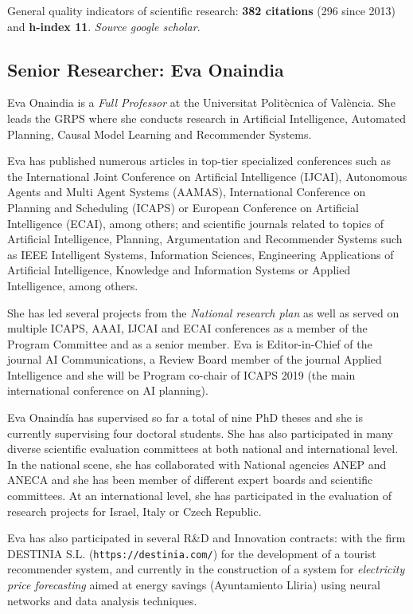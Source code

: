 \documentclass[10pt,a4paper]{paper}
\begin{document}
General quality indicators of scientific research: {\bf 382 citations} (296 since 2013) and {\bf h-index 11}. {\scriptsize\em Source google scholar}.


\subsection{Senior Researcher: Eva Onaindia}
Eva Onaindia is a {\em Full Professor} at the Universitat Politècnica of València. She leads the GRPS where she conducts research in Artificial Intelligence, Automated Planning, Causal Model Learning and Recommender Systems.

Eva has published numerous articles in top-tier specialized conferences such as the International Joint Conference on Artificial Intelligence (IJCAI), Autonomous Agents and Multi Agent Systems (AAMAS), International Conference on Planning and Scheduling (ICAPS) or European Conference on Artificial Intelligence (ECAI), among others; and scientific journals related to topics of Artificial Intelligence, Planning, Argumentation and Recommender Systems such as IEEE Intelligent Systems, Information Sciences, Engineering Applications of Artificial Intelligence, Knowledge and Information Systems or Applied Intelligence, among others.

She has led several projects from the {\em National research plan} as well as served on multiple ICAPS, AAAI, IJCAI and ECAI conferences as a member of the Program Committee and as a senior member. Eva is Editor-in-Chief of the journal AI Communications, a Review Board member of the journal Applied Intelligence and she will be Program co-chair of ICAPS 2019 (the main international conference on AI planning). 

Eva Onaindía has supervised so far a total of nine PhD theses and she is currently supervising four doctoral students. She has also participated in many diverse scientific evaluation committees at both national and international level. In the national scene, she has collaborated with National agencies ANEP and ANECA and she has been member of different expert boards and scientific committees. At an international level, she has participated in the evaluation of research projects for Israel, Italy or Czech Republic.

Eva has also participated in several R\&D and Innovation contracts: with the firm {\sc DESTINIA S.L.} ({\tt https://destinia.com/}) for the development of a tourist recommender system, and currently in the construction of a system for {\em electricity price forecasting} aimed at energy savings (Ayuntamiento Lliria) using neural networks and data analysis techniques.
\end{document}
